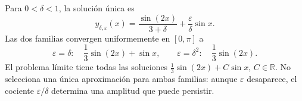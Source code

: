 Para \(0<\delta<1\), la solución única es
\[
y_{\delta,\varepsilon}(x)=\frac{\sin(2x)}{3+\delta}
+\frac{\varepsilon}{\delta}\sin x.
\]
Las dos familias convergen uniformemente en \([0,\pi]\) a
\[
\varepsilon=\delta:\quad \frac13\sin(2x)+\sin x,
\qquad
\varepsilon=\delta^2:\quad \frac13\sin(2x).
\]
El problema límite tiene todas las soluciones \(\frac13\sin(2x)+C\sin x\), \(C\in\mathbb R\). No selecciona una única aproximación para ambas familias: aunque \(\varepsilon\) desaparece, el cociente \(\varepsilon/\delta\) determina una amplitud que puede persistir.
